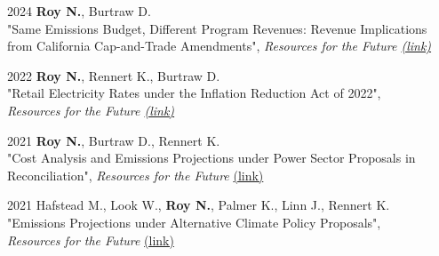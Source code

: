 \documentclass[margin]{res}
\begin{document}
\begin{resume}
2024 \hspace{4mm}%
\textbf{Roy N.}, Burtraw D. \\
    \hspace*{16mm} "Same Emissions Budget, Different Program Revenues: Revenue Implications \\
    \hspace*{16mm}  from California Cap-and-Trade Amendments",  \textit{Resources for the Future \href{https://www.rff.org/publications/issue-briefs/california-cap-and-trade-emissions-budget-climate-policy/}{(link)}}
    
2022 \hspace{4mm}%
\textbf{Roy N.}, Rennert K., Burtraw D. \\ 
\hspace*{16mm} 
    "Retail Electricity Rates under the Inflation Reduction Act of 2022", \\ 
    \hspace*{16mm}   \textit{Resources for the Future \href{https://www.rff.org/publications/issue-briefs/retail-electricity-rates-under-the-inflation-reduction-act-of-2022/} {(link)} }
    
2021 \hspace{4mm}%
    \textbf{Roy N.}, Burtraw D., Rennert K. \\ 
    \hspace*{16mm}    "Cost Analysis and Emissions Projections under Power Sector Proposals in \\
    \hspace*{16mm}  Reconciliation", \textit{Resources for the Future} \href{https://www.rff.org/publications/issue-briefs/cost-analysis-and-emissions-projections-under-power-sector-proposals-in-reconciliation/} {(link)} 
    
2021 \hspace{4mm}%
    Hafstead M., Look W., \textbf{Roy N.}, Palmer K., Linn J., Rennert K. \\
    \hspace*{16mm} "Emissions Projections under Alternative Climate Policy Proposals", \\
    \hspace*{16mm} \textit{Resources for the Future} \href{https://www.rff.org/publications/issue-briefs/emissions-projections-under-alternative-climate-policy-proposals/} {(link)}
    

\end{resume}
\end{document}

